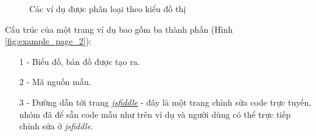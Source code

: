 \documentclass[12pt,a4paper]{article}
\begin{document}
\begin{figure}[!h]
	\begin{center}
    \caption{Các ví dụ được phân loại theo kiểu đồ thị}
    \label{fig:example_page}
	\end{center}
\end{figure}

Cấu trúc của một trang ví dụ bao gồm ba thành phần (Hình \ref{fig:example_page_2}):
\begin{itemize}
\item[1 - ] Biểu đồ, bản đồ được tạo ra.
\item[2 - ] Mã nguồn mẫu.
\item[3 - ] Đường dẫn tới trang \href{https://jsfiddle.net/}{\textit{jsfiddle}} - đây là một trang chỉnh sửa code trực tuyến, nhóm đã để sẵn code mẫu như trên ví dụ và người dùng có thể trực tiếp chỉnh sửa ở \textit{jsfiddle}.
\end{itemize}
\end{document}
